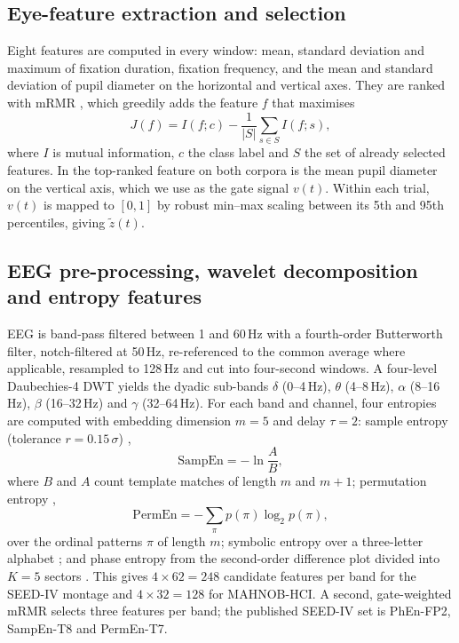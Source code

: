 \documentclass[10pt,twoside]{article}
\begin{document}
\subsection{Eye-feature extraction and selection}
Eight features are computed in every window: mean, standard deviation and maximum of fixation duration, fixation frequency, and the mean and standard deviation of pupil diameter on the horizontal and vertical axes. They are ranked with mRMR \cite{Peng2005}, which greedily adds the feature $f$ that maximises
\begin{equation}
J(f)=I(f;c)-\frac{1}{|S|}\sum_{s\in S} I(f;s),
\label{eq:mrmr}
\end{equation}
where $I$ is mutual information, $c$ the class label and $S$ the set of already selected features. In \cite{FarhadiSedehi2024a} the top-ranked feature on both corpora is the mean pupil diameter on the vertical axis, which we use as the gate signal $v(t)$. Within each trial, $v(t)$ is mapped to $[0,1]$ by robust min--max scaling between its 5th and 95th percentiles, giving $\tilde z(t)$.

\subsection{EEG pre-processing, wavelet decomposition and entropy features}
EEG is band-pass filtered between 1 and 60\,Hz with a fourth-order Butterworth filter, notch-filtered at 50\,Hz, re-referenced to the common average where applicable, resampled to 128\,Hz and cut into four-second windows. A four-level Daubechies-4 DWT \cite{Mallat1989} yields the dyadic sub-bands $\delta$ (0--4\,Hz), $\theta$ (4--8\,Hz), $\alpha$ (8--16\,Hz), $\beta$ (16--32\,Hz) and $\gamma$ (32--64\,Hz). For each band and channel, four entropies are computed with embedding dimension $m=5$ and delay $\tau=2$: sample entropy (tolerance $r=0.15\,\sigma$) \cite{Richman2000},
\begin{equation}
\mathrm{SampEn}=-\ln\frac{A}{B},
\end{equation}
where $B$ and $A$ count template matches of length $m$ and $m+1$; permutation entropy \cite{Bandt2002},
\begin{equation}
\mathrm{PermEn}=-\sum_{\pi} p(\pi)\log_2 p(\pi),
\end{equation}
over the ordinal patterns $\pi$ of length $m$; symbolic entropy over a three-letter alphabet \cite{Zebrowski2000}; and phase entropy from the second-order difference plot divided into $K=5$ sectors \cite{Rohila2019}. This gives $4\times62=248$ candidate features per band for the SEED-IV montage and $4\times32=128$ for MAHNOB-HCI. A second, gate-weighted mRMR selects three features per band; the published SEED-IV set is PhEn-FP2, SampEn-T8 and PermEn-T7.
\end{document}
